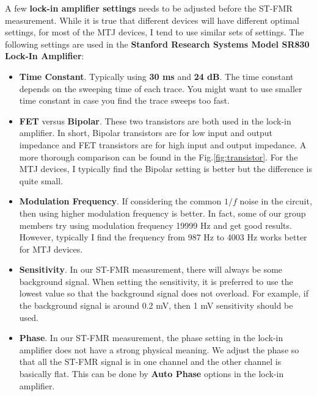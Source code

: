 A few \textbf{lock-in amplifier settings} needs to be adjusted before the ST-FMR measurement. While it is true that different devices will have different optimal settings, for most of the  MTJ devices, I tend to use similar sets of settings. The following settings are used in the \textbf{Stanford Research Systems Model SR830 Lock-In Amplifier}:

\begin{itemize}
	\item \textbf{Time Constant}. Typically using \textbf{30 ms} and \textbf{24 dB}. The time constant depends on the sweeping time of each trace. You might want to use smaller time constant in case you find the trace sweeps too fast.
	\item \textbf{FET} versus \textbf{Bipolar}. These two transistors are both used in the lock-in amplifier. In short, Bipolar transistors are for low input and output impedance and FET transistors are for high input and output impedance. A more thorough comparison can be found in the Fig.\ref{fig:transistor}. For the MTJ devices, I typically find the Bipolar setting is better but the difference is quite small.
	\item \textbf{Modulation Frequency}. If considering the common $1/f$ noise in the circuit, then using higher modulation frequency is better. In fact, some of our group members try using modulation frequency 19999 Hz and get good results. However, typically I find the frequency from 987 Hz to 4003 Hz works better for MTJ devices.
	\item \textbf{Sensitivity}. In our ST-FMR measurement, there will always be some background signal. When setting the sensitivity, it is preferred to use the lowest value so that the background signal does not overload. For example, if the background signal is around 0.2 mV, then 1 mV sensitivity should be used.
	\item \textbf{Phase}. In our ST-FMR measurement, the phase setting in the lock-in amplifier does not have a strong physical meaning. We adjust the phase so that all the ST-FMR signal is in one channel and the other channel is basically flat. This can be done by \textbf{Auto Phase} options in the lock-in amplifier. 
\end{itemize}

